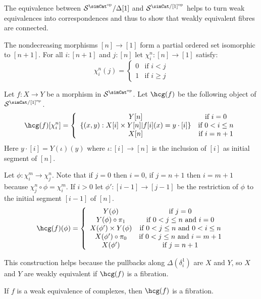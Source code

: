 \documentclass{tac}
\newcommand\cat\mathcal
\newcommand\set[1]{\left\{#1\right\}}
\newcommand\dual{^{\mathrm{op}}}
\newcommand\s{^{\simCat\dual}}
\newcommand\of{:}
\newcommand\simplex\Delta
\begin{document}
The equivalence between $\cat S\s/\simplex[1]$ and $\cat S^{\simCat/[1]\dual}$ helps to turn weak equivalences into correspondences and thus to show that weakly equivalent fibres are connected.


\begin{definition} The nondecreasing morphisms $[n]\to[1]$ form a partial ordered set isomorphic to $[n+1]$. For all $i\of[n+1]$ and $j\of[n]$ let $\chi^n_i\of[n]\to[1]$ satisfy:
\[ \chi^n_i(j) =\left\{
	\begin{array}{cc}
		0 & \textrm{if $i<j$}\\
		1 & \textrm{if $i\geq j$}
	\end{array}
\right.\]

Let $f\of X\to Y$ be a morphism in $\cat S\s$. Let $\hcg(f)$ be the following object of $\cat S^{\simCat/[1]\dual}$. 
\[ \hcg(f)[\chi^n_i] =\left\{
	\begin{array}{cc}
		Y[n] & \textrm{if $i=0$}\\
		\set{ (x,y)\of X[i]\times Y[n] | f[i](x) = y\cdot[i] } & \textrm{if $0<i\leq n$}\\
		X[n] & \textrm{if $i=n+1$}
	\end{array}
\right.\]
Here $y\cdot[i] = Y(\iota)(y)$ where $\iota\of[i]\to[n]$ is the inclusion of $[i]$ as initial segment of $[n]$.

Let $\phi\of \chi^m_i\to\chi^n_j$. Note that if $j=0$ then $i=0$, if $j=n+1$ then $i=m+1$ because $\chi^n_j\circ \phi= \chi^m_i$. If $i>0$ let $\phi'\of [i-1]\to [j-1]$ be the restriction of $\phi$ to the initial segment $[i-1]$ of $[n]$.
\[ \hcg(f)(\phi) =\left\{
	\begin{array}{cc}
		Y(\phi) & \textrm{if $j=0$}\\
		Y(\phi)\circ \pi_1 & \textrm{if $0<j\leq n$ and $i=0$}\\
		X(\phi')\times Y(\phi) & \textrm{if $0<j\leq n$ and $0<i\leq n$}\\
		X(\phi')\circ \pi_0 & \textrm{if $0<j\leq n$ and $i=m+1$}\\
		X(\phi') & \textrm{if $j=n+1$}
	\end{array}
\right.\]
\end{definition}

This construction helps because the pullbacks along $\simplex(\delta^1_i)$ are $X$ and $Y$, so $X$ and $Y$ are weakly equivalent if $\hcg(f)$ is a fibration.

\begin{lemma} If $f$ is a weak equivalence of complexes, then $\hcg(f)$ is a fibration. \end{lemma}
\end{document}
